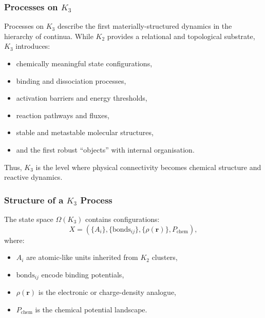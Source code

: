 

\subsubsection{Processes on \texorpdfstring{$K_3$}{K_3}}
\label{sec:processes-k3}

Processes on $K_3$ describe the first materially-structured dynamics in
the hierarchy of continua. While $K_2$ provides a relational and
topological substrate, $K_3$ introduces:
\begin{itemize}
    \item chemically meaningful state configurations,
    \item binding and dissociation processes,
    \item activation barriers and energy thresholds,
    \item reaction pathways and fluxes,
    \item stable and metastable molecular structures,
    \item and the first robust ``objects'' with internal organisation.
\end{itemize}

Thus, $K_3$ is the level where physical connectivity becomes chemical
structure and reactive dynamics.

\subsubsection{Structure of a \texorpdfstring{$K_3$}{K_3} Process}

The state space $\Omega(K_3)$ contains configurations:
\[
X = (\{A_i\}, \{\text{bonds}_{ij}\}, \{\rho(\mathbf{r})\}, P_\text{chem}),
\]
where:
\begin{itemize}
    \item $A_i$ are atomic-like units inherited from $K_2$ clusters,
    \item $\text{bonds}_{ij}$ encode binding potentials,
    \item $\rho(\mathbf{r})$ is the electronic or charge-density analogue,
    \item $P_\text{chem}$ is the chemical potential landscape.
\end{itemize}

